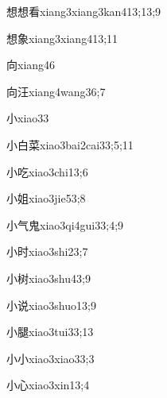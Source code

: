 \begin{verbete}{想想看}{xiang3xiang3kan4}{13;13;9}
\end{verbete}
\begin{verbete}{想象}{xiang3xiang4}{13;11}
\end{verbete}
\begin{verbete}{向}{xiang4}{6}
\end{verbete}
\begin{verbete}{向汪}{xiang4wang3}{6;7}
\end{verbete}
\begin{verbete}{小}{xiao3}{3}
\end{verbete}
\begin{verbete}{小白菜}{xiao3bai2cai3}{3;5;11}
\end{verbete}
\begin{verbete}{小吃}{xiao3chi1}{3;6}
\end{verbete}
\begin{verbete}{小姐}{xiao3jie5}{3;8}
\end{verbete}
\begin{verbete}{小气鬼}{xiao3qi4gui3}{3;4;9}
\end{verbete}
\begin{verbete}{小时}{xiao3shi2}{3;7}
\end{verbete}
\begin{verbete}{小树}{xiao3shu4}{3;9}
\end{verbete}
\begin{verbete}{小说}{xiao3shuo1}{3;9}
\end{verbete}
\begin{verbete}{小腿}{xiao3tui3}{3;13}
\end{verbete}
\begin{verbete}{小小}{xiao3xiao3}{3;3}
\end{verbete}
\begin{verbete}{小心}{xiao3xin1}{3;4}
\end{verbete}
